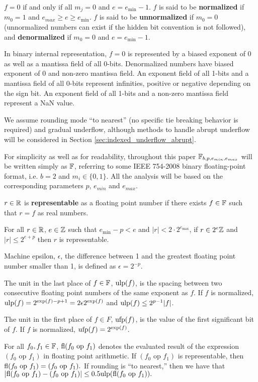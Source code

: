   $f = 0$ if and only if all $m_j = 0$ and $e = e_{\min} - 1$.
  $f$ is said to be \textbf{normalized} if $m_0 =1$
  and $e_{max} \geq e \geq e_{\min}$.
  $f$ is said to be \textbf{unnormalized} if $m_0 = 0$ (unnormalized numbers can 
  exist if the hidden bit convention is not followed), and
  \textbf{denormalized} if $m_0 = 0$ and $e = e_{\min} - 1$.

  In binary internal representation, $f=0$ is represented by a biased exponent of $0$
  as well as a mantissa field of all 0-bits.
  Denormalized numbers have biased exponent of $0$ and non-zero mantissa field.
  An exponent field of all 1-bits and a mantissa field of all 0-bits
  represent infinities, positive or negative depending on the sign bit.
  An exponent field of all 1-bits and a non-zero mantissa field
  represent a NaN value.

  We assume rounding mode ``to nearest'' (no specific tie
  breaking behavior is required) and gradual underflow, although
  methods to handle abrupt underflow will be considered in Section
  \ref{sec:indexed_underflow_abrupt}.

  For simplicity as well as for readability, throughout this paper
  $\mathbb{F}_{b,p,e_{min},e_{max}}$ will be written simply as $\mathbb{F}$, referring to
  some IEEE 754-2008 binary floating-point format,
  i.e. $b=2$ and $m_i \in \{0, 1\}$.
  All the analysis will be based on the corresponding parameters $p$, $e_{min}$
  and $e_{max}$.

  $r \in \mathbb{R}$ is \textbf{representable} as a floating point number if there
  exists $f \in \mathbb{F}$ such that $r = f$ as real numbers.

  For all $r \in \mathbb{R}$, $e \in \mathbb{Z}$ such that $e_{\min} - p < e$ and $|r| < 2
  \cdot 2^{e_{\max}}$, if $r \in 2^e\mathbb{Z}$ and $|r| \leq 2^{e + p}$ then $r$ is
  representable.

  Machine epsilon, $\epsilon$, the difference between 1 and the greatest
  floating point number smaller than 1, is defined as $\epsilon = 2^{-p}$.

  The unit in the last place of $f \in \mathbb{F}$, $\text{ulp}(f)$, is the spacing between
  two consecutive floating point numbers of the same exponent as $f$. If $f$ is
  normalized, $\text{ulp}(f) = 2^{\text{exp}(f) - p + 1} = 2  \epsilon  2^{\text{exp}(f)}$ and
  $\text{ulp}(f) \leq 2^{p - 1}|f|$.

  The unit in the first place of $f \in F$, $\text{ufp}(f)$, is the value of the
  first significant bit of $f$. If $f$ is normalized, $\text{ufp}(f) = 2^{\text{exp}(f)}$.

  For all $f_0, f_1 \in \mathbb{F}$, $\text{fl}(f_0 \text{ op } f_1)$ denotes the evaluated
  result of the expression $(f_0 \text{ op } f_1)$ in floating point
  arithmetic. If $(f_0 \text{ op } f_1)$ is representable, then
  \(
    \text{fl}(f_0 \text{ op } f_1) = (f_0 \text{ op } f_1).
  \)
  If rounding is ``to nearest,'' then we have that
  \(
    |\text{fl}(f_0 \text{ op } f_1) - (f_0 \text{ op } f_1)| \leq 0.5\text{ulp}(\text{fl}(f_0 \text{ op } f_1)).
  \)

